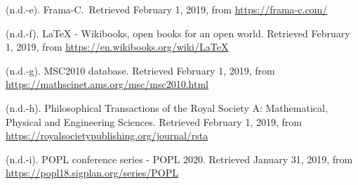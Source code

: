 \documentclass[12pt,twoside]{article}
\begin{document}
{\begin{thebibliography}{222}
\mdbibitemlabel{[n.d.-e]}(n.d.-e). Frama-C.~Retrieved February 1, 2019, from \href{https://frama-c.com/}{{\ttfamily https://\hspace{0pt}frama-\hspace{0pt}c.\hspace{0pt}com/\hspace{0pt}}}\label{cea_frama-c_nodate}%

\mdbibitemlabel{[n.d.-f]}(n.d.-f). LaTeX - Wikibooks, open books for an open world. Retrieved February 1, 2019, from \href{https://en.wikibooks.org/wiki/LaTeX}{{\ttfamily https://\hspace{0pt}en.\hspace{0pt}wikibooks.\hspace{0pt}org/\hspace{0pt}wiki/\hspace{0pt}LaTeX}}\label{wikibook_latex_nodate}%

\mdbibitemlabel{[n.d.-g]}(n.d.-g). MSC2010 database. Retrieved February 1, 2019, from \href{https://mathscinet.ams.org/msc/msc2010.html}{{\ttfamily https://\hspace{0pt}mathscinet.\hspace{0pt}ams.\hspace{0pt}org/\hspace{0pt}msc/\hspace{0pt}msc2010.\hspace{0pt}html}}\label{acm_msc2010_nodate}%

\mdbibitemlabel{[n.d.-h]}(n.d.-h). Philosophical Transactions of the Royal Society A: Mathematical, Physical and Engineering Sciences. Retrieved February 1, 2019, from \href{https://royalsocietypublishing.org/journal/rsta}{{\ttfamily https://\hspace{0pt}royalsocietypublishing.\hspace{0pt}org/\hspace{0pt}journal/\hspace{0pt}rsta}}\label{royalsociety_philosophical_nodate}%

\mdbibitemlabel{[n.d.-i]}(n.d.-i). POPL conference series - POPL 2020. Retrieved January 31, 2019, from \href{https://popl18.sigplan.org/series/POPL}{{\ttfamily https://\hspace{0pt}popl18.\hspace{0pt}sigplan.\hspace{0pt}org/\hspace{0pt}series/\hspace{0pt}POPL}}\label{acm_popl_nodate}%


\end{thebibliography}}
\end{document}

